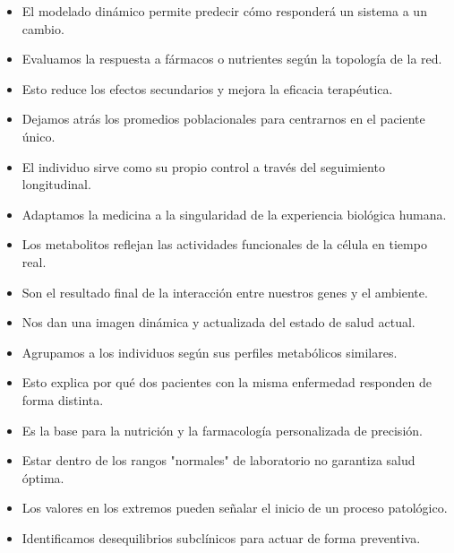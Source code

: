         \begin{itemize}
            \item El modelado dinámico permite predecir cómo responderá un sistema a un cambio.
            \item Evaluamos la respuesta a fármacos o nutrientes según la topología de la red.
            \item Esto reduce los efectos secundarios y mejora la eficacia terapéutica.
        \end{itemize}

        \begin{itemize}
            \item Dejamos atrás los promedios poblacionales para centrarnos en el paciente único.
            \item El individuo sirve como su propio control a través del seguimiento longitudinal.
            \item Adaptamos la medicina a la singularidad de la experiencia biológica humana.
        \end{itemize}

        \begin{itemize}
            \item Los metabolitos reflejan las actividades funcionales de la célula en tiempo real.
            \item Son el resultado final de la interacción entre nuestros genes y el ambiente.
            \item Nos dan una imagen dinámica y actualizada del estado de salud actual.
        \end{itemize}

        \begin{itemize}
            \item Agrupamos a los individuos según sus perfiles metabólicos similares.
            \item Esto explica por qué dos pacientes con la misma enfermedad responden de forma distinta.
            \item Es la base para la nutrición y la farmacología personalizada de precisión.
        \end{itemize}

        \begin{itemize} 
            \item Estar dentro de los rangos "normales" de laboratorio no garantiza salud óptima. 
            \item Los valores en los extremos pueden señalar el inicio de un proceso patológico. 
            \item Identificamos desequilibrios subclínicos para actuar de forma preventiva. 
        \end{itemize}

